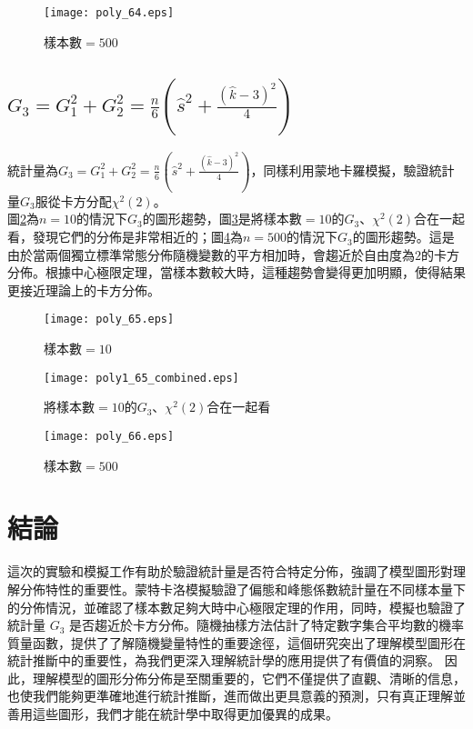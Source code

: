 \documentclass[12pt, a4paper]{article}
\begin{document}
\begin{figure}[H]
\centering
\texttt{[image: poly\_64.eps]}
\caption{樣本數$=500$}
\label{fig:poly_64.eps}
\end{figure} 


\subsection{$G_3 = G_1^2 + G_2^2 = \frac{n}{6} \left(\hat{s}^2 +\frac{(\hat{k} - 3)^2}{4}\right)$}
統計量為\;$G_3 = G_1^2 + G_2^2 = \frac{n}{6} \left(\hat{s}^2 +\frac{(\hat{k} - 3)^2}{4}\right)$\;，同樣利用蒙地卡羅模擬，驗證統計量\;$G_3$\;服從卡方分配\;$\chi^2(2)$\;。\\
圖\;\ref{fig:poly_65.eps}\;為\;$n=10$\;的情況下\;$G_3$\;的圖形趨勢，圖\;\ref{fig:poly1_65_combined.eps}\;是將樣本數$=10$的\;$G_3$、$\chi^2(2)$\;合在一起看，發現它們的分佈是非常相近的；圖\;\ref{fig:poly_66.eps}\;為\;$n=500$\;的情況下\;$G_3$\;的圖形趨勢。這是由於當兩個獨立標準常態分佈隨機變數的平方相加時，會趨近於自由度為\;$2$\;的卡方分佈。根據中心極限定理，當樣本數較大時，這種趨勢會變得更加明顯，使得結果更接近理論上的卡方分佈。

\begin{figure}[H]
\centering
\texttt{[image: poly\_65.eps]}
\caption{樣本數$=10$}
\label{fig:poly_65.eps}
\end{figure} 

\begin{figure}[H]
\centering
\texttt{[image: poly1\_65\_combined.eps]}
\caption{將樣本數$=10$的\;$G_3$、$\chi^2(2)$\;合在一起看}
\label{fig:poly1_65_combined.eps}
\end{figure} 

\begin{figure}[H]
\centering
\texttt{[image: poly\_66.eps]}
\caption{樣本數$=500$}
\label{fig:poly_66.eps}
\end{figure} 

\section{結論}

這次的實驗和模擬工作有助於驗證統計量是否符合特定分佈，強調了模型圖形對理解分佈特性的重要性。蒙特卡洛模擬驗證了偏態和峰態係數統計量在不同樣本量下的分佈情況，並確認了樣本數足夠大時中心極限定理的作用，同時，模擬也驗證了統計量 $G_3$ 是否趨近於卡方分佈。隨機抽樣方法估計了特定數字集合平均數的機率質量函數，提供了了解隨機變量特性的重要途徑，這個研究突出了理解模型圖形在統計推斷中的重要性，為我們更深入理解統計學的應用提供了有價值的洞察。
因此，理解模型的圖形分佈分佈是至關重要的，它們不僅提供了直觀、清晰的信息，也使我們能夠更準確地進行統計推斷，進而做出更具意義的預測，只有真正理解並善用這些圖形，我們才能在統計學中取得更加優異的成果。
\end{document}
